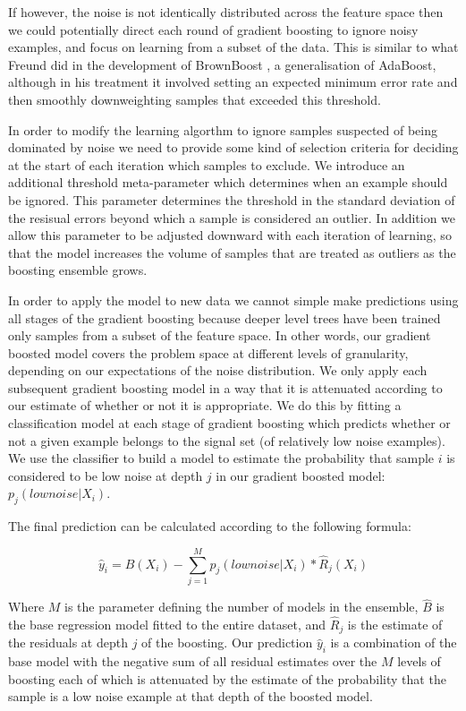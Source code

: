 \documentclass[12pt,a4paper]{article}
\begin{document}
If however, the noise is not identically distributed across the feature space then we could potentially direct each round of
gradient boosting to ignore noisy examples, and focus on learning from a subset of the data. This is similar to what Freund
did in the development of BrownBoost \cite{Freund2001}, a generalisation of AdaBoost, although in his treatment it involved
setting an expected minimum error rate and then smoothly downweighting samples that exceeded this threshold.

In order to modify the learning algorthm to ignore samples suspected of being dominated by noise we need to provide some
kind of selection criteria for deciding at the start of each iteration which samples to exclude.
We introduce an additional threshold meta-parameter which determines when an example should be ignored. This parameter
determines the threshold in the standard deviation of the resisual errors beyond which a sample is considered an outlier.
In addition we allow this parameter to be adjusted downward with each iteration of learning, so that the model 
increases the volume of samples that are treated as outliers as the boosting ensemble grows.

In order to apply the model to new data we cannot simple make predictions using all stages of the gradient boosting because
deeper level trees have been trained only samples from a subset of the feature space. In other words, our gradient boosted model
covers the problem space at different levels of granularity, depending on our expectations of the noise distribution.
We only apply each subsequent gradient boosting model in a way that it is attenuated according to our estimate of
whether or not it is appropriate. We do this by fitting a classification model at each stage of gradient boosting which predicts
whether or not a given example belongs to the signal set (of relatively low noise examples). We use the classifier to
build a model to estimate the probability that sample $i$ is considered to be low noise at depth $j$ in our gradient 
boosted model: $p_j(low noise | X_i )$.

The final prediction can be calculated according to the following formula:

\begin{equation}
\hat{y}_i = \hat{B}(X_i) - \sum_{j=1}^M p_j(low noise | X_i) * \hat{R}_j(X_i)
\label{eq:pred}
\end{equation}

Where $M$ is the parameter defining the number of models in the ensemble, $\hat{B}$ is the base regression model fitted to the
entire dataset, and $\hat{R}_j$ is the estimate of the residuals at depth $j$ of the boosting.
Our prediction $\hat{y}_i$ is a combination of the base model with the negative sum of all residual estimates over the $M$ 
levels of boosting each of which is attenuated by the estimate of the probability that the sample is a low noise example at that 
depth of the boosted model.
\end{document}
